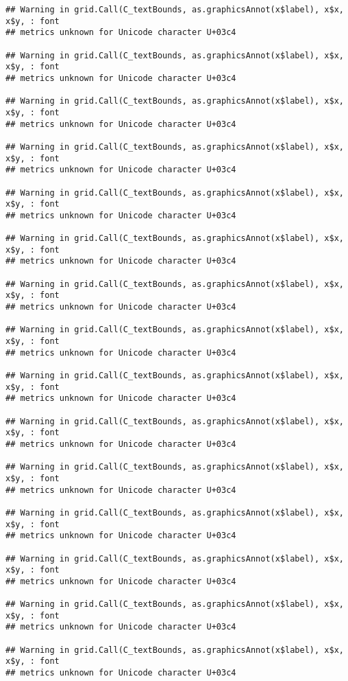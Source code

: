 \documentclass[
]{article}
\begin{document}
\begin{verbatim}
## Warning in grid.Call(C_textBounds, as.graphicsAnnot(x$label), x$x, x$y, : font
## metrics unknown for Unicode character U+03c4

## Warning in grid.Call(C_textBounds, as.graphicsAnnot(x$label), x$x, x$y, : font
## metrics unknown for Unicode character U+03c4

## Warning in grid.Call(C_textBounds, as.graphicsAnnot(x$label), x$x, x$y, : font
## metrics unknown for Unicode character U+03c4

## Warning in grid.Call(C_textBounds, as.graphicsAnnot(x$label), x$x, x$y, : font
## metrics unknown for Unicode character U+03c4

## Warning in grid.Call(C_textBounds, as.graphicsAnnot(x$label), x$x, x$y, : font
## metrics unknown for Unicode character U+03c4

## Warning in grid.Call(C_textBounds, as.graphicsAnnot(x$label), x$x, x$y, : font
## metrics unknown for Unicode character U+03c4

## Warning in grid.Call(C_textBounds, as.graphicsAnnot(x$label), x$x, x$y, : font
## metrics unknown for Unicode character U+03c4

## Warning in grid.Call(C_textBounds, as.graphicsAnnot(x$label), x$x, x$y, : font
## metrics unknown for Unicode character U+03c4

## Warning in grid.Call(C_textBounds, as.graphicsAnnot(x$label), x$x, x$y, : font
## metrics unknown for Unicode character U+03c4

## Warning in grid.Call(C_textBounds, as.graphicsAnnot(x$label), x$x, x$y, : font
## metrics unknown for Unicode character U+03c4

## Warning in grid.Call(C_textBounds, as.graphicsAnnot(x$label), x$x, x$y, : font
## metrics unknown for Unicode character U+03c4

## Warning in grid.Call(C_textBounds, as.graphicsAnnot(x$label), x$x, x$y, : font
## metrics unknown for Unicode character U+03c4

## Warning in grid.Call(C_textBounds, as.graphicsAnnot(x$label), x$x, x$y, : font
## metrics unknown for Unicode character U+03c4

## Warning in grid.Call(C_textBounds, as.graphicsAnnot(x$label), x$x, x$y, : font
## metrics unknown for Unicode character U+03c4

## Warning in grid.Call(C_textBounds, as.graphicsAnnot(x$label), x$x, x$y, : font
## metrics unknown for Unicode character U+03c4


\end{verbatim}
\end{document}
